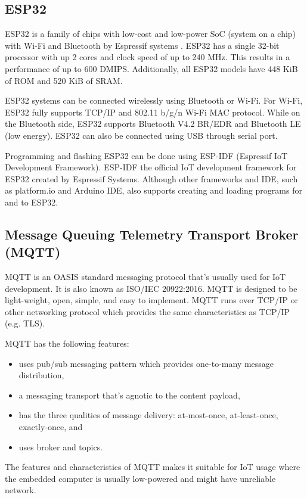 \subsection{ESP32}

ESP32 is a family of chips with low-cost and low-power SoC (system on a chip)
with Wi-Fi and Bluetooth by Espressif systems \cite{esp32_net}. ESP32 has a single
32-bit processor with up 2 cores and clock speed of up to 240 MHz. This results
in a performance of up to 600 DMIPS. Additionally, all ESP32 models have 448 KiB
of ROM and 520 KiB of SRAM\cite{esp32_datasheet}.

ESP32 systems can be connected wirelessly using Bluetooth or Wi-Fi. For Wi-Fi,
ESP32 fully supports TCP/IP and 802.11 b/g/n Wi-Fi MAC protocol. While on the
Bluetooth side, ESP32 supports Bluetooth V4.2 BR/EDR and Bluetooth LE (low energy).
ESP32 can also be connected using USB through serial port\cite{esp32_datasheet}.

Programming and flashing ESP32 can be done using ESP-IDF (Espressif IoT
Development Framework). ESP-IDF the official IoT development framework for ESP32
created by Espressif Systems. Although other frameworks and IDE, such as
platform.io and Arduino IDE, also supports creating and loading programs for and
to ESP32.

\subsection{Message Queuing Telemetry Transport Broker (MQTT)}

MQTT is an OASIS standard messaging protocol that's usually used for IoT
development. It is also known as ISO/IEC 20922:2016. MQTT is designed to be
light-weight, open, simple, and easy to implement\cite{mqtt_iso}. MQTT runs over
TCP/IP or other networking protocol which provides the same characteristics as
TCP/IP (e.g. TLS).

MQTT has the following features:
\begin{itemize}
	\item uses pub/sub messaging pattern which provides one-to-many message
	      distribution,
	\item a messaging transport that's agnotic to the content payload,
	\item has the three qualities of message delivery: at-most-once,
	      at-least-once, exactly-once, and
	\item uses broker and topics.
\end{itemize}
The features and characteristics of MQTT makes it suitable for IoT usage
where the embedded computer is usually low-powered and might have unreliable
network.


